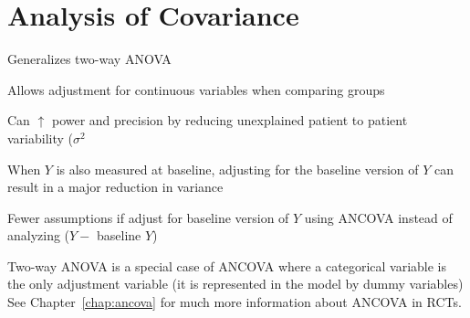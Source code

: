 \section{Analysis of Covariance} 
\bi
\item Generalizes two-way ANOVA
\item Allows adjustment for continuous variables when comparing groups
\item Can $\uparrow$ power and precision by reducing unexplained
  patient to patient variability ($\sigma^2$
\item When $Y$ is also measured at baseline, adjusting for the
  baseline version of $Y$ can result in a major reduction in variance
\item Fewer assumptions if adjust for baseline version of $Y$ using
  ANCOVA instead of analyzing ($Y -$ baseline $Y$)
\item Two-way ANOVA is a special case of ANCOVA where a categorical
  variable is the only adjustment variable (it is represented in the
  model by dummy variables)
\ei
See Chapter~\ref{chap:ancova} for much more information about ANCOVA
in RCTs.   %


